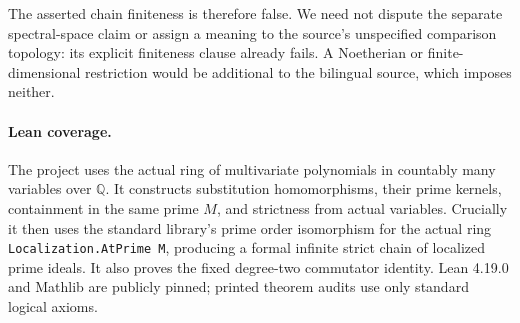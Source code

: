 \documentclass[11pt]{article}
\begin{document}
The asserted chain finiteness is therefore false. We need not
dispute the separate spectral-space claim or assign a meaning to
the source's unspecified comparison topology: its explicit
finiteness clause already fails. A Noetherian or finite-dimensional
restriction would be additional to the bilingual source, which
imposes neither.

\paragraph{Lean coverage.}
The project uses the actual ring of multivariate polynomials in
countably many variables over $\mathbb Q$. It constructs substitution
homomorphisms, their prime kernels, containment in the same prime
$M$, and strictness from actual variables. Crucially it then uses
the standard library's prime order isomorphism for the actual ring
\texttt{Localization.AtPrime M}, producing a formal infinite strict
chain of localized prime ideals. It also proves the fixed degree-two
commutator identity. Lean 4.19.0 and Mathlib are publicly pinned;
printed theorem audits use only standard logical axioms.
\end{document}
